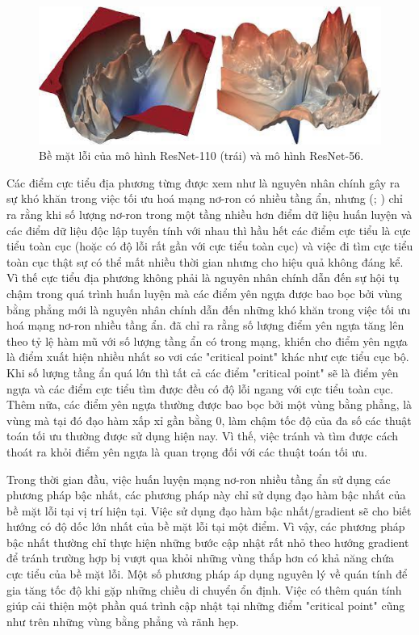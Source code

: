 \begin{figure}[htp]
\centering
\includegraphics[width=120 mm]{images/resnet-loss.png}
\caption{Bề mặt lỗi của mô hình ResNet-110 (trái) và mô hình ResNet-56.\parencite{li2018visualizing}}
\label{fig:resnet-loss}
\end{figure}

Các điểm cực tiểu địa phương từng được xem như là nguyên nhân chính gây ra sự khó khăn trong việc tối ưu hoá mạng nơ-ron có nhiều tầng ẩn, nhưng (\cite{nguyen2017thelosssurface}; \cite{choromanska2014thelosssurface}) chỉ ra rằng khi số lượng nơ-ron trong một tầng nhiều hơn điểm dữ liệu huấn luyện và các điểm dữ liệu độc lập tuyến tính với nhau thì hầu hết các điểm cực tiểu là cực tiểu toàn cục (hoặc có độ lỗi rất gần với cực tiểu toàn cục) và việc đi tìm cực tiểu toàn cục thật sự có thể mất nhiều thời gian nhưng cho hiệu quả không đáng kể. Vì thế cực tiểu địa phương không phải là nguyên nhân chính dẫn đến sự hội tụ chậm trong quá trình huấn luyện mà các điểm yên ngựa được bao bọc bởi vùng bằng phẳng mới là nguyên nhân chính dẫn đến những khó khăn trong việc tối ưu hoá mạng nơ-ron nhiều tầng ẩn. \parencite{dauphin2014identifying} đã chỉ ra rằng số lượng điểm yên ngựa tăng lên theo tỷ lệ hàm mũ với số lượng tầng ẩn có trong mạng, khiến cho điểm yên ngựa là điểm xuất hiện nhiều nhất so vơi các "critical point" khác như cực tiểu cục bộ. Khi số lượng tầng ẩn quá lớn thì tất cả các điểm "critical point" sẽ là điểm yên ngựa và các điểm cực tiểu tìm được đều có độ lỗi ngang với cực tiểu toàn cục. Thêm nữa, các điểm yên ngựa thường được bao bọc bởi một vùng bằng phẳng, là vùng mà tại đó đạo hàm xấp xỉ gần bằng 0, làm chậm tốc độ của đa số các thuật toán tối ưu thường được sử dụng hiện nay. Vì thế, việc tránh và tìm được cách thoát ra khỏi điểm yên ngựa là quan trọng đối với các thuật toán tối ưu.

Trong thời gian đầu, việc huấn luyện mạng nơ-ron nhiều tầng ẩn sử dụng các phương pháp bậc nhất, các phương pháp này chỉ sử dụng đạo hàm bậc nhất của bề mặt lỗi tại vị trí hiện tại. Việc sử dụng đạo hàm bậc nhất/gradient sẽ cho biết hướng có độ dốc lớn nhất của bề mặt lỗi tại một điểm. Vì vậy, các phương pháp bậc nhất thường chỉ thực hiện những bước cập nhật rất nhỏ theo hướng gradient để tránh trường hợp bị vượt qua khỏi những vùng thấp hơn có khả năng chứa cực tiểu của bề mặt lỗi. Một số phương pháp áp dụng nguyên lý về quán tính để gia tăng tốc độ khi gặp những chiều di chuyển ổn định. Việc có thêm quán tính giúp cải thiện một phần quá trình cập nhật tại những điểm "critical point" cũng như trên những vùng bằng phẳng và rãnh hẹp.

